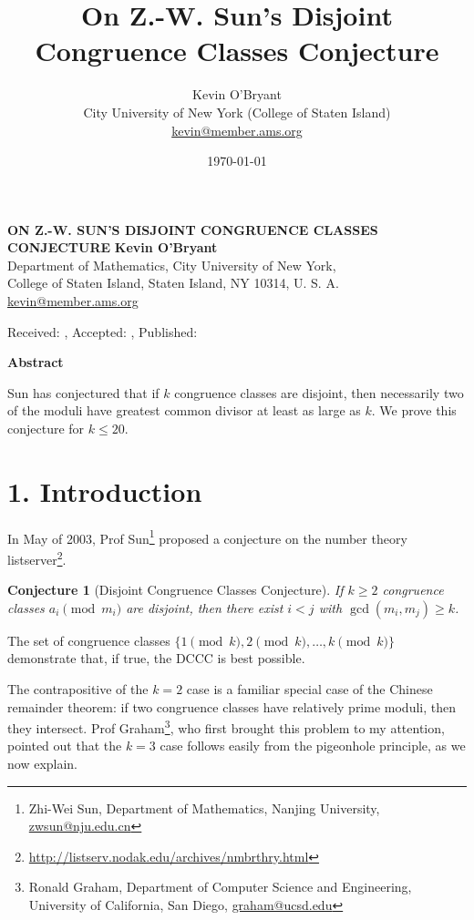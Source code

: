 \documentclass[12pt]{article}
\title{On Z.-W. Sun's Disjoint Congruence Classes Conjecture}
\author{Kevin O'Bryant \\ City University of New York (College of Staten Island)\\ \url{kevin@member.ams.org}}
\date{\today}
\newif\ifpdf
\newtheorem{cnj}[thm]{Conjecture}
\begin{document}
    \ifpdf
       \DeclareGraphicsExtensions{.pdf,.jpg,.mps,.png}
    \fi
\begin{center}
 {\bf ON Z.-W. SUN'S DISJOINT CONGRUENCE CLASSES CONJECTURE}
 \vskip 20pt
 {\bf Kevin O'Bryant}\\
 {\smallit Department of Mathematics, City University of New York, \\College of Staten Island, Staten Island, NY
 10314, U. S. A.}\\
 {\url{kevin@member.ams.org}}\\
\end{center}
 \vskip 30pt
\centerline{\smallit Received: , Accepted: , Published: }
 \vskip 30pt

\centerline{\bf Abstract}

\noindent Sun has conjectured that if $k$ congruence classes are disjoint, then necessarily two of the moduli
have greatest common divisor at least as large as $k$. We prove this conjecture for $k\le 20$.

\pagestyle{myheadings} 

\thispagestyle{empty} \baselineskip=15pt \vskip 30pt

\section*{\normalsize 1. Introduction} In May of 2003, Prof Sun\footnote{Zhi-Wei Sun, Department of Mathematics, Nanjing University,
\url{zwsun@nju.edu.cn}} proposed a conjecture on the number theory
listserver\footnote{\url{http://listserv.nodak.edu/archives/nmbrthry.html}}.

\begin{cnj}[Disjoint Congruence Classes Conjecture]\label{cnj:dccc}
    If $k\ge 2$ congruence classes $a_i \pmod{m_i}$ are disjoint, then there exist $i<j$ with
    $\gcd(m_i,m_j)\ge k$.
\end{cnj}

The set of congruence classes $\{1\pmod{k},2\pmod k, \dots, k \pmod k\}$ demonstrate that, if true, the DCCC is
best possible.

The contrapositive of the $k=2$ case is a familiar special case of the Chinese remainder theorem: if two
congruence classes have relatively prime moduli, then they intersect. Prof Graham\footnote{Ronald Graham,
Department of Computer Science and Engineering, University of California, San Diego, \url{graham@ucsd.edu}}, who
first brought this problem to my attention, pointed out that the $k=3$ case follows easily from the pigeonhole
principle, as we now explain.
\end{document}
